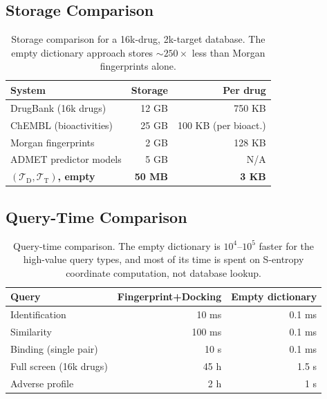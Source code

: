 \documentclass[11pt,twocolumn,a4paper]{article}
\theoremstyle{definition}
\theoremstyle{remark}
\newcommand{\Trie}{\mathcal{T}}
\newcommand{\Dtrie}{\Trie_{\mathrm{D}}}
\newcommand{\Ttrie}{\Trie_{\mathrm{T}}}
\begin{document}
\subsection{Storage Comparison}

\begin{table}[H]
\centering
\small
\begin{tabular}{lrr}
\toprule
\textbf{System} & \textbf{Storage} & \textbf{Per drug} \\
\midrule
DrugBank (16k drugs) & 12 GB & 750 KB \\
ChEMBL (bioactivities) & 25 GB & 100 KB (per bioact.) \\
Morgan fingerprints & 2 GB & 128 KB \\
ADMET predictor models & 5 GB & N/A \\
\textbf{$(\Dtrie, \Ttrie)$, empty} & \textbf{50 MB} & \textbf{3 KB} \\
\bottomrule
\end{tabular}
\caption{Storage comparison for a 16k-drug, 2k-target database. The empty dictionary approach stores $\sim\!250\times$ less than Morgan fingerprints alone.}
\label{tab:storage}
\end{table}

\subsection{Query-Time Comparison}

\begin{table}[H]
\centering
\small
\begin{tabular}{lrr}
\toprule
\textbf{Query} & \textbf{Fingerprint+Docking} & \textbf{Empty dictionary} \\
\midrule
Identification & 10 ms & 0.1 ms \\
Similarity & 100 ms & 0.1 ms \\
Binding (single pair) & 10 s & 0.1 ms \\
Full screen (16k drugs) & 45 h & 1.5 s \\
Adverse profile & 2 h & 1 s \\
\bottomrule
\end{tabular}
\caption{Query-time comparison. The empty dictionary is $10^4$--$10^5$ faster for the high-value query types, and most of its time is spent on S-entropy coordinate computation, not database lookup.}
\label{tab:query_time}
\end{table}

\end{document}
